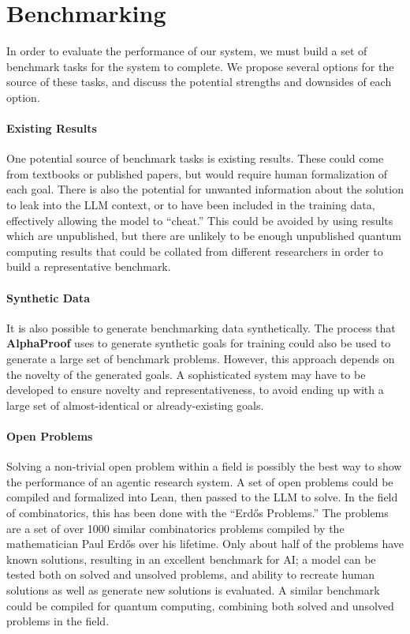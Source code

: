 \documentclass[letterpaper]{article} %
\begin{document}
\section{Benchmarking}

In order to evaluate the performance of our system, we must build a set of benchmark
tasks for the system to complete. We propose several options for the source of these tasks,
and discuss the potential strengths and downsides of each option.

\paragraph{Existing Results}

One potential source of benchmark tasks is existing results.
These could come from textbooks or published papers, but would require
human formalization of each goal.
There is also the potential for unwanted information about the solution
to leak into the LLM context, or to have been included in the training data,
effectively allowing the model to ``cheat.''
This could be avoided by using results which are unpublished, but there
are unlikely to be enough unpublished quantum computing results that could
be collated from different researchers in order to build a representative benchmark.

\paragraph{Synthetic Data}

It is also possible to generate benchmarking data synthetically.
The process that \textbf{AlphaProof} uses to generate synthetic goals for training
could also be used to generate a large set of benchmark problems.
However, this approach depends on the novelty of the generated goals.
A sophisticated system may have to be developed to ensure novelty and representativeness,
to avoid ending up with a large set of almost-identical
or already-existing goals.

\paragraph{Open Problems}

Solving a non-trivial open problem within a field is possibly the best way to
show the performance of an agentic research system.
A set of open problems could be compiled and formalized into Lean,
then passed to the LLM to solve.
In the field of combinatorics, this has been done with the ``Erdős Problems.''
The problems are a set of over 1000 similar combinatorics problems compiled by
the mathematician Paul Erdős over his lifetime.
Only about half of the problems have known solutions, resulting in an excellent
benchmark for AI; a model can be tested both on solved and unsolved problems,
and ability to recreate human solutions as well as generate new solutions is evaluated.
A similar benchmark could be compiled for quantum computing, combining both solved
and unsolved problems in the field.


\end{document}
